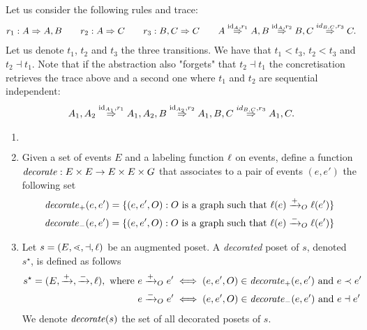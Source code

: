 \begin{example}
  Let us consider the following rules and trace:
  \begin{align*}
    r_1:A \Rightarrow A, B\qquad r_2:A \Rightarrow C \qquad r_3: B,C \Rightarrow C\qquad
    A \overset{\text{id}_A,r_1}{\Rightarrow} A, B \overset{\text{id}_A,r_2}{\Rightarrow} B,C \overset{id_{B,C},r_3}{\Rightarrow}C.
  \end{align*}
  Let us denote $t_1$, $t_2$ and $t_3$ the three transitions. We have that $t_1<t_3$, $t_2<t_3$ and $t_2\dashv t_1$.
  Note that if the abstraction also "forgets" that $t_2\dashv t_1$ the concretisation retrieves the trace above and a second one where $t_1$ and $t_2$ are sequential independent:
  \begin{align*}
    A_1,A_2 \overset{\text{id}_{A_1},r_1}{\Rightarrow} A_1,A_2,B \overset{\text{id}_{A_2},r_2}{\Rightarrow} A_1,B,C \overset{id_{B,C},r_3}{\Rightarrow} A_1,C.
  \end{align*}
\end{example}

\begin{definition}
  \begin{enumerate}
  \item[] $~$
  \item Given a set of events $E$ and a labeling function $\ell$ on events, define a function $\mathit{decorate}:E\times E \to E\times E\times G$ that associates to a pair of events $(e,e')$ the following set
    \begin{align*}
      \mathit{decorate}_{+}(e,e') = \{(e,e',O) : O\text{ is a graph such that }\ell(e)\mathrel{\xrightarrow{+}}_O \ell(e')\}\\
       \mathit{decorate}_{-}(e,e') = \{(e,e',O) : O\text{ is a graph such that }\ell(e)\mathrel{\xrightarrow{-}}_O \ell(e')\}
    \end{align*}

  \item Let $s = (E,\lessdot,\dashv,\ell)$ be an augmented poset. A \emph{decorated} poset of $s$, denoted $s^{\star}$, is defined as follows
    \begin{align*}
      s^{\star} = (E,\mathrel{\xrightarrow{+}},\mathrel{\xrightarrow{-}},\ell), \text{ where }
      &e\mathrel{\xrightarrow{+}}_O e' \iff (e,e',O)\in\mathit{decorate}_+(e,e')\text{ and }e\prec e'\\
      &e\mathrel{\xrightarrow{-}}_O e' \iff (e,e',O)\in\mathit{decorate}_-(e,e')\text{ and }e\dashv e'\\
    \end{align*}
    We denote $\mathit{decorate}(s)$ the set of all decorated posets of $s$.
  \end{enumerate}
\end{definition}

